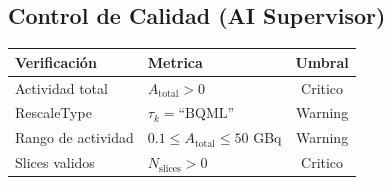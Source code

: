 \documentclass[12pt,a4paper]{article}
\begin{document}
\begin{tcolorbox}[aiSupervisor]
\subsection*{Control de Calidad (AI Supervisor)}

\begin{table}[H]
\centering
\begin{tabular}{llc}
\toprule
\textbf{Verificación} & \textbf{Metrica} & \textbf{Umbral} \\
\midrule
Actividad total & $A_{\text{total}} > 0$ & Critico \\
RescaleType & $\tau_k = \text{``BQML''}$ & Warning \\
Rango de actividad & $0.1 \leq A_{\text{total}} \leq 50$ GBq & Warning \\
Slices validos & $N_{\text{slices}} > 0$ & Critico \\
\bottomrule
\end{tabular}
\end{table}

\newpage


\newpage


\newpage


\newpage


\newpage


\newpage


\newpage


\newpage

\end{tcolorbox}
\end{document}
